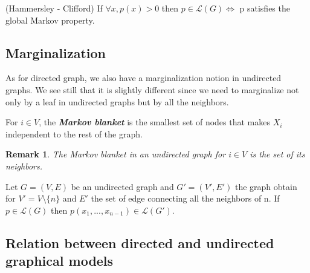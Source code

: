 \documentclass[12pt]{report}
\newtheorem{remark}{Remark}[section]
\begin{document}
\begin{theorem} 
(Hammersley - Clifford) If $\forall x, p(x) > 0$ then $p \in \mathcal{L}(G) \iff $ p satisfies the global Markov property.
\end{theorem}

\subsection{Marginalization}

As for directed graph, we also have a marginalization notion in undirected graphs. We see still that it is slightly different since we need to marginalize not only by a leaf in undirected graphs but by all the neighbors.
\begin{definition}
For $i \in V$, the \emph{\textbf{Markov blanket}} is the smallest set of nodes that makes $X_i$ independent to the rest of the graph.
\end{definition}

\begin{remark}
The Markov blanket in an undirected graph for $i \in V$ is the set of its neighbors.
\end{remark}

\begin{proposition}
Let $G = (V, E)$ be an undirected graph and $G' = (V', E')$ the graph obtain for $V' = V \setminus \{n\}$ and $E'$ the set of edge connecting all the neighbors of n. If $p \in \mathcal{L}(G)$ then $p(x_1, ..., x_{n-1}) \in \mathcal{L}(G')$.
\end{proposition}

\subsection{Relation between directed and undirected graphical models}
\end{document}
